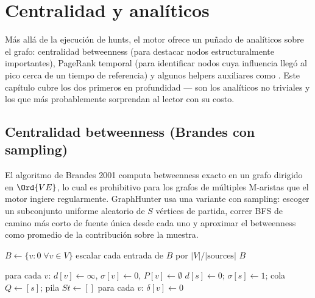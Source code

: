 \chapter{Centralidad y analíticos}
\label{ch:analytics}

Más allá de la ejecución de hunts, el motor ofrece un puñado de
analíticos sobre el grafo: centralidad betweenness (para
destacar nodos estructuralmente importantes), PageRank temporal
(para identificar nodos cuya influencia llegó al pico cerca de
un tiempo de referencia) y algunos helpers auxiliares como
. Este capítulo cubre los dos
primeros en profundidad --- son los analíticos no triviales y los
que más probablemente sorprendan al lector con su costo.

\section{Centralidad betweenness (Brandes con sampling)}

El algoritmo de Brandes 2001 computa betweenness exacto en un
grafo dirigido en $\Ord{VE}$, lo cual es prohibitivo para los
grafos de múltiples M-aristas que el motor ingiere
regularmente. GraphHunter usa una variante con sampling:
escoger un subconjunto uniforme aleatorio de $S$ vértices de
partida, correr BFS de camino más corto de fuente única desde
cada uno y aproximar el betweenness como promedio de la
contribución sobre la muestra.

\begin{algorithm}
\caption{\textsc{Compute-Betweenness}}\label{alg:betweenness}
$B \gets \{v : 0 \;\forall v \in V\}$\;
escalar cada entrada de $B$ por $|V| / |\text{sources}|$\;
\Return $B$\;
\end{algorithm}

\begin{algorithm}
\caption{\textsc{Brandes-Single-Source}}\label{alg:brandes-ss}
para cada $v$: $d[v] \gets \infty$, $\sigma[v] \gets 0$, $P[v] \gets \emptyset$\;
$d[s] \gets 0$; $\sigma[s] \gets 1$; cola $Q \gets [s]$; pila $St \gets []$\;
para cada $v$: $\delta[v] \gets 0$\;
\end{algorithm}

